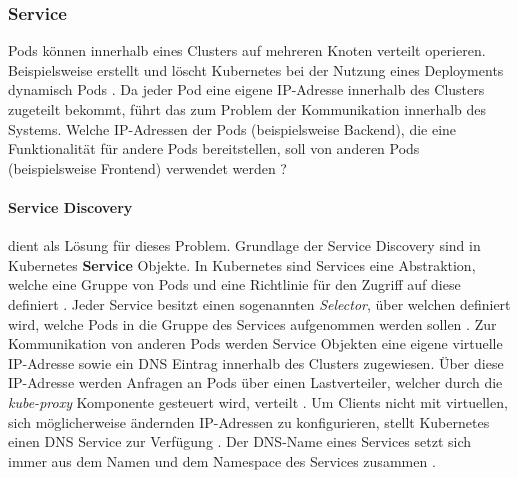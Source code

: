 \subsubsection{Service}
\label{subsec:kubernetes:service}
Pods können innerhalb eines Clusters auf mehreren Knoten verteilt operieren.
Beispielsweise erstellt und löscht Kubernetes bei der Nutzung eines Deployments dynamisch Pods \cite{kubernetesService}.
Da jeder Pod eine eigene IP-Adresse innerhalb des Clusters zugeteilt bekommt, führt das zum Problem der Kommunikation innerhalb des Systems.
Welche IP-Adressen der Pods (beispielsweise Backend),
die eine Funktionalität für andere Pods bereitstellen, soll von anderen Pods (beispielsweise Frontend) verwendet werden \cite{kubernetesService}?
\paragraph{Service Discovery}
dient als Lösung für dieses Problem.
Grundlage der Service Discovery sind in Kubernetes \textbf{Service} Objekte.
In Kubernetes sind Services eine Abstraktion, welche eine Gruppe von Pods und eine Richtlinie für den Zugriff auf diese definiert \cite{kubernetesService}.
Jeder Service besitzt einen sogenannten \emph{Selector}, über welchen definiert wird, welche Pods in die Gruppe des Services aufgenommen werden sollen \cite{Burns2019}.
Zur Kommunikation von anderen Pods werden Service Objekten eine eigene virtuelle IP-Adresse 
sowie ein DNS Eintrag innerhalb des Clusters zugewiesen.
Über diese IP-Adresse werden Anfragen an Pods über einen Lastverteiler, welcher durch die \emph{kube-proxy} Komponente gesteuert wird,
verteilt \cite{Burns2019}.
Um Clients nicht mit virtuellen, sich möglicherweise ändernden IP-Adressen zu konfigurieren, stellt Kubernetes einen DNS Service zur
Verfügung \cite{Burns2019}.
Der DNS-Name eines Services setzt sich immer aus dem Namen und dem Namespace des Services zusammen \cite{kubernetesService}.